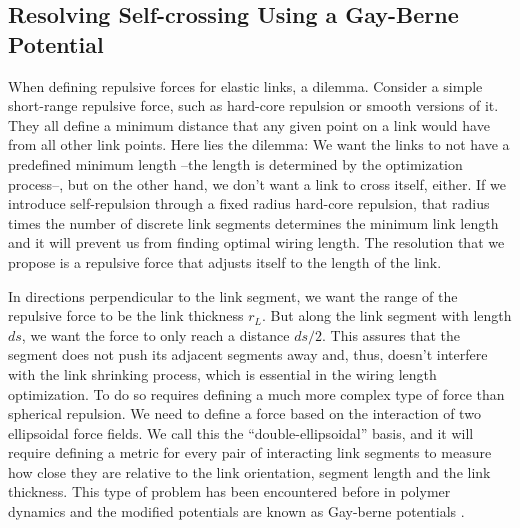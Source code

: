 \documentclass[endfloats,nofootinbib,preprint,floatfix,titlepage,superscriptaddress,linenumbers]{revtex4-1} %
\begin{document}
\subsection{Resolving Self-crossing Using a Gay-Berne Potential \label{ap:gay-berne}}
When defining repulsive forces for elastic links,  a dilemma. 
Consider a simple short-range repulsive force, such as hard-core repulsion or smooth versions of it. 
They all define a minimum distance that any given point on a link would have from all other link points. 
Here lies the dilemma: 
We want the links to not have a predefined minimum length --the length is determined by the optimization process--, but on the other hand, we don't want a link to cross itself, either. 
If we introduce self-repulsion through a fixed radius hard-core repulsion, that radius times the number of discrete link segments determines the minimum link length and it will prevent us from finding optimal wiring length. 
The resolution that we propose is a repulsive force that adjusts itself to the length of the link. 

In directions perpendicular to the link segment, we want the range of the repulsive force to be the link thickness $r_L$. But along the link segment with length $ds$, we want the force to only reach a distance $ds/2$. 
This assures that the segment does not push its adjacent segments away and, thus, doesn't interfere with the link shrinking process, which is essential in the wiring length optimization.
To do so requires defining a much more complex type of force than spherical repulsion. 
We need to define a force based on the interaction of two ellipsoidal force fields. We call this the ``double-ellipsoidal'' basis, and it will require defining a metric for every pair of interacting link segments to measure how close they are relative to the link orientation, segment length and the link thickness. 
This type of problem has been encountered before in polymer dynamics and the modified potentials are known as Gay-berne potentials \citep{berne1972gaussian,gay1981modification,babadi2006coarse}. 
\end{document}
